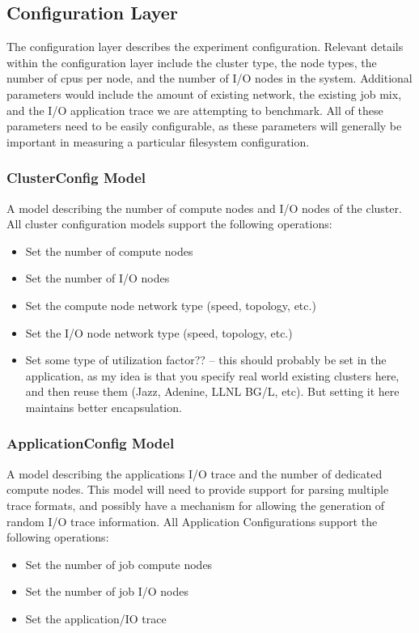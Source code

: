 \documentclass[11pt]{article}
\begin{document}
\subsection{Configuration Layer}
The configuration layer describes the experiment configuration.  Relevant
details within the configuration layer include the cluster type, the node
types, the number of cpus per node, and the number of I/O nodes in the system.
Additional parameters would include the amount of existing network, the
existing job mix, and the I/O application trace we are attempting to
benchmark.  All of these parameters need to be easily configurable, as these
parameters will generally be important in measuring a particular filesystem
configuration.

\subsubsection{ClusterConfig Model}
A model describing the number of compute nodes and I/O nodes of the cluster.
All cluster configuration models support the following operations:

\begin{itemize}
\item Set the number of compute nodes
\item Set the number of I/O nodes
\item Set the compute node network type (speed, topology, etc.)
\item Set the I/O node network type (speed, topology, etc.)
\item Set some type of utilization factor?? -- this should probably be set in
  the application, as my idea is that you specify real world existing clusters
  here, and then reuse them (Jazz, Adenine, LLNL BG/L, etc).  But setting it
  here maintains better encapsulation.
\end{itemize}

\subsubsection{ApplicationConfig Model}
A model describing the applications I/O trace and the number of dedicated
compute nodes.  This model will need to provide support for parsing multiple
trace formats, and possibly have a mechanism for allowing the generation of
random I/O trace information.  All Application Configurations support the
following operations:

\begin{itemize}
\item Set the number of job compute nodes
\item Set the number of job I/O nodes
\item Set the application/IO trace
\end{itemize}
\end{document}
